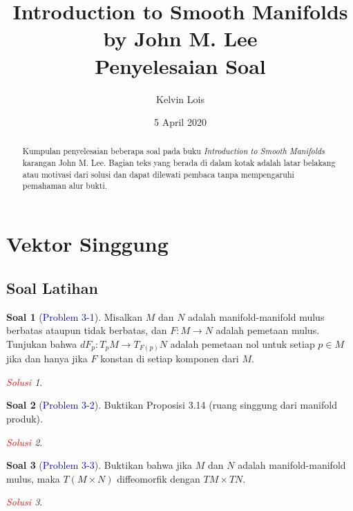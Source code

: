 \documentclass[11pt]{article}
\title{Introduction to Smooth Manifolds by John M. Lee \\
  \large Penyelesaian Soal}
\author{Kelvin Lois}
\date{5 April 2020}
\theoremstyle{definition}
\newtheorem*{problem}{Soal}
\theoremstyle{remark}
\newtheorem*{solution}{\textcolor{red}{Solusi}}
\begin{document}
 
\maketitle \tableofcontents 

\begin{abstract}
    Kumpulan penyelesaian beberapa soal pada buku \textit{Introduction to Smooth Manifolds} karangan John M. Lee. Bagian teks yang berada di dalam kotak adalah latar belakang atau motivasi dari solusi dan dapat dilewati pembaca tanpa mempengaruhi pemahaman alur bukti.
\end{abstract}

\section{Vektor Singgung}
\subsection{Soal Latihan}

\begin{problem}[\textcolor{blue}{Problem 3-1}]
Misalkan $M$ dan $N$ adalah manifold-manifold mulus berbatas ataupun tidak berbatas, dan $F : M \to N$ adalah pemetaan mulus. Tunjukan bahwa $dF_p : T_pM \to T_{F(p)}N$ adalah pemetaan nol untuk setiap $p \in M$ jika dan hanya jika $F$ konstan di setiap komponen dari $M$. 
\end{problem}

\begin{solution}

\end{solution}


\begin{problem}[\textcolor{blue}{Problem 3-2}]
Buktikan Proposisi 3.14 (ruang singgung dari manifold produk).
\end{problem}

\begin{solution}

\end{solution}



\begin{problem}[\textcolor{blue}{Problem 3-3}]
Buktikan bahwa jika $M$ dan $N$ adalah manifold-manifold mulus, maka $T(M \times N)$ diffeomorfik dengan $TM \times TN$.
\end{problem}

\begin{solution}

\end{solution}
\end{document}
